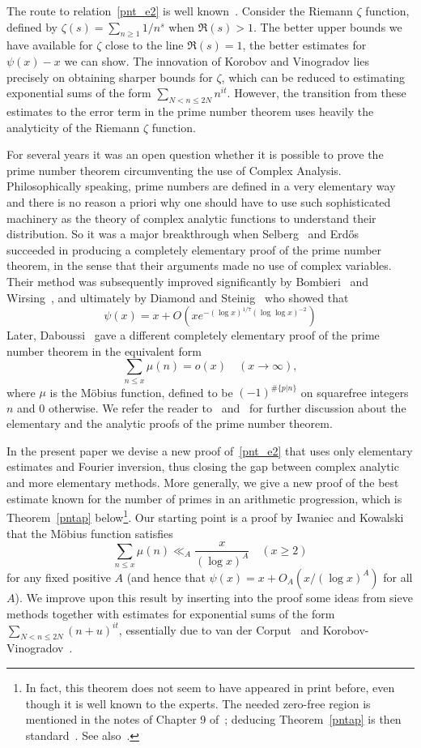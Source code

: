 \documentclass[12pt]{amsart}
\theoremstyle{remark}
\newcommand{\be}{\begin{equation}}
\newcommand{\ee}{\end{equation}}
\numberwithin{equation}{section}
\begin{document}
The route to relation~\eqref{pnt_e2} is well known~\cite[Theorem 3.10]{titch}. Consider the Riemann $\zeta$ function, defined by $\zeta(s)=\sum_{n\ge1}1/n^s$ when $\Re(s)>1$. The better upper bounds we have available for $\zeta$ close to the line $\Re(s)=1$, the better estimates for $\psi(x)-x$ we can show. The innovation of Korobov and Vinogradov lies precisely on obtaining sharper bounds for $\zeta$, which can be reduced to estimating exponential sums of the form $\sum_{N<n\le2N}n^{it}$. However, the transition from these estimates to the error term in the prime number theorem uses heavily the analyticity of the Riemann $\zeta$ function.

For several years it was an open question whether it is possible to prove the prime number theorem circumventing the use of Complex Analysis. Philosophically speaking, prime numbers are defined in a very elementary way and there is no reason a priori why one should have to use such sophisticated machinery as the theory of complex analytic functions to understand their distribution. So it was a major breakthrough when Selberg~\cite{Sel1} and Erd\H os~\cite{Erd} succeeded in producing a completely elementary proof of the prime number theorem, in the sense that their arguments made no use of complex variables. Their method was subsequently improved significantly by Bombieri~\cite{bombieri} and Wirsing~\cite{wirsing}, and ultimately by Diamond and Steinig~\cite{DiamSt} who showed that 
$$
\psi(x)=x+O\left(xe^{-(\log x)^{1/7}(\log\log x)^{-2}} \right)
$$
Later, Daboussi~\cite{daboussi} gave a different completely elementary proof of the prime number theorem in the equivalent form
$$
\sum_{n\le x}\mu(n)=o(x)\quad(x\to\infty),
$$
where $\mu$ is the M\"obius function, defined to be $(-1)^{\#\{p|n\}}$ on squarefree integers $n$ and 0 otherwise. We refer the reader to~\cite[Section 2.4]{ik} and~\cite{goldfeld,granville} for further discussion about the elementary and the analytic proofs of the prime number theorem.

In the present paper we devise a new proof of~\eqref{pnt_e2} that uses only elementary estimates and Fourier inversion, thus closing the gap between complex analytic and more elementary methods. More generally, we give a new proof of the best estimate known for the number of primes in an arithmetic progression, which is Theorem~\ref{pntap} below\footnote{In fact, this theorem does not seem to have appeared in print before, even though it is well known to the experts. The needed zero-free region is mentioned in the notes of Chapter 9 of~\cite{mont2}; deducing Theorem~\ref{pntap} is then standard\ \cite[p. 120, 126]{Dav}. See also~\cite{LZ}.}. Our starting point is a proof by Iwaniec and Kowalski~\cite[p. 40-42]{ik} that the M\"obius function satisfies
\be\label{pnt ik}
\sum_{n\le x}\mu(n)\ll_A\frac x{(\log x)^A}\quad(x\ge2)
\ee
for any fixed positive $A$ (and hence that $\psi(x)=x+O_A(x/(\log x)^A)$ for all $A$). We improve upon this result by inserting into the proof some ideas from sieve methods together with estimates for exponential sums of the form $\sum_{N<n\le2N}(n+u)^{it}$, essentially due to van der Corput~\cite[Chapter 5]{titch} and Korobov-Vinogradov~\cite[Chapter 2]{walfisz}.
\end{document}
